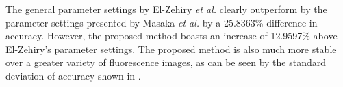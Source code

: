 \documentclass[10pt, journal, letterpaper, onecolumn, draftcls]{IEEEtran}
\begin{document}
The general parameter settings by El-Zehiry \textit{et al.}  \cite{ElZehiry2007}  
clearly outperform by the parameter settings presented by Masaka \textit{et al.} \cite{Maska2013} 
by a 25.8363\% difference in accuracy. However, the proposed method boasts an increase of 12.9597\% above El-Zehiry's parameter settings. The proposed method is also much more stable over a greater variety of fluorescence images, as can be seen by the standard deviation of accuracy shown in .













%
%



%
%
\end{document}

